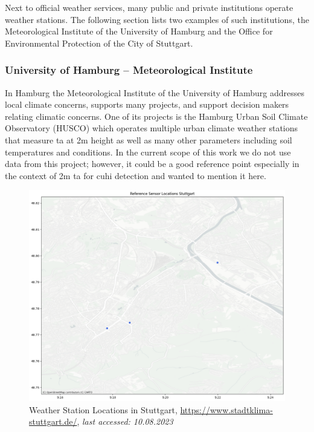 Next to official weather services, many public and private institutions operate weather stations. The following section lists two examples of such institutions, the Meteorological Institute of the University of Hamburg and the Office for Environmental Protection of the City of Stuttgart.

\subsubsection{University of Hamburg – Meteorological Institute}

In Hamburg the Meteorological Institute of the University of Hamburg addresses local climate concerns, supports many projects, and support decision makers relating climatic concerns. One of its projects is the Hamburg Urban Soil Climate Observatory (HUSCO) which operates multiple urban climate weather stations that measure \gls{ta} at 2m height as well as many other parameters including soil temperatures and conditions. In the current scope of this work we do not use data from this project; however, it could be a good reference point especially in the context of 2m \gls{ta} for \gls{cuhi} detection and wanted to mention it here.

\begin{figure}[ht]
    \centering
    \includegraphics[width=1\textwidth]{images/afu_stuttgart_sensor_locations.png}
    \caption{Weather Station Locations in Stuttgart, \url{https://www.stadtklima-stuttgart.de/}, \textit{last accessed: 10.08.2023}}
    \label{fig:afu weather station locations}
\end{figure}

